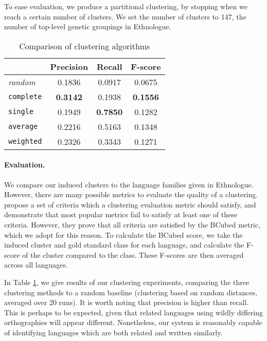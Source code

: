 To ease evaluation, we produce a partitional clustering, by stopping when we reach a certain number of clusters. We set the number of clusters to 147, the number of top-level genetic groupings in Ethnologue.

\begin{table}[t]
\begin{centering}

    \begin{tabular}{l|ccc}
    ~        & Precision & Recall       & F-score    \\ \hline
	\emph{random} & 0.1836	& 0.0917	& 0.0675 \\ \hline
	\texttt{complete} & \textbf{0.3142}	& 0.1938	 & \textbf{0.1556} \\
	\texttt{single} & 0.1949	& \textbf{0.7850}	 & 0.1282 \\
	\texttt{average} & 0.2216	& 0.5163	& 0.1348 \\
	\texttt{weighted} & 0.2326	& 0.3343	& 0.1271 \\
    \end{tabular}
\caption{Comparison of clustering algorithms}
\label{table:cluster}
\end{centering}
\end{table}

\paragraph{Evaluation.}
We compare our induced clusters to the language families given in Ethnologue. However, there are many possible metrics to evaluate the quality of a clustering.  propose a set of criteria which a clustering evaluation metric should satisfy, and demonstrate that most popular metrics fail to satisfy at least one of these criteria.  However, they prove that all criteria are satisfied by the BCubed metric, which we adopt for this reason.  To calculate the BCubed score, we take the induced cluster and gold standard class for each language, and calculate the F-score of the cluster compared to the class.  These F-scores are then averaged across all languages.

In Table \ref{table:cluster}, we give results of our clustering experiments, comparing the three clustering methods to a random baseline (clustering based on random distances, averaged over 20 runs).  It is worth noting that precision is higher than recall.  This is perhaps to be expected, given that related languages using wildly differing orthographies will appear different.  Nonetheless, our system is reasonably capable of identifying languages which are both related and written similarly.

